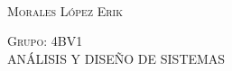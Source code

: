 \begin{titlepage}
\begin{minipage}[c][0.81\textheight][t]{0.25\textwidth}
\begin{center}
    \end{center}
  \end{minipage}
  \begin{minipage}[c][0.81\textheight][t]{0.75\textwidth}
    \begin{center}
      \vspace{0.5cm}

      {\color{black}{\LARGE \scshape 
      Práctica 7\\[.2in]
      Reglas de Negocio y Modelo Relacional}}\\[.2in]

      \vspace{1.5cm}            

      
      \textsc{\large {Morales López Erik}}\\[1cm]

      \vspace{0.5cm}

        
      {\large\scshape 
        {\color{black}Grupo: 4BV1}\\[0.3cm] 
        {ANÁLISIS Y DISEÑO DE SISTEMAS}\\[.2in]}

      \vspace{1cm}
       


      \begin{center}
        
    \end{center}
    \end{center}
  \end{minipage}
\end{titlepage}
